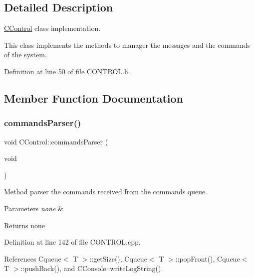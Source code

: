 \subsection{Detailed Description}
\mbox{\hyperlink{class_c_control}{C\+Control}} class implementation. 

This class implements the methods to manager the messages and the commands of the system. 

Definition at line 50 of file C\+O\+N\+T\+R\+O\+L.\+h.



\subsection{Member Function Documentation}
\mbox{\label{class_c_control_a0ebf3ab01f3ea77f261b630ed2541f9d}} 
\subsubsection{\texorpdfstring{commands\+Parser()}{commandsParser()}}
{\footnotesize\ttfamily void C\+Control\+::commands\+Parser (\begin{DoxyParamCaption}\item[{void}]{ }\end{DoxyParamCaption})}



Method parser the commands received from the commands queue. 


\begin{DoxyParams}{Parameters}
{\em none} & \\
\hline
\end{DoxyParams}
\begin{DoxyReturn}{Returns}
none 
\end{DoxyReturn}


Definition at line 142 of file C\+O\+N\+T\+R\+O\+L.\+cpp.



References Cqueue$<$ T $>$\+::get\+Size(), Cqueue$<$ T $>$\+::pop\+Front(), Cqueue$<$ T $>$\+::push\+Back(), and C\+Console\+::write\+Log\+String().

\mbox{\label{class_c_control_aa997117cf869f0e31dbb1f87f29ae8bf}} 
